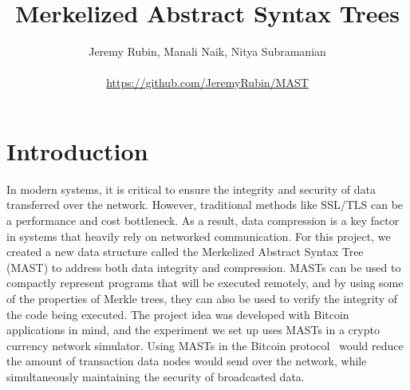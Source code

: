 \documentclass{vldb}
\begin{document}



\title{Merkelized Abstract Syntax Trees}




\author{
\alignauthor Jeremy Rubin, Manali Naik, Nitya Subramanian\\
\vspace{.2cm}
        \\
       \url{https://github.com/JeremyRubin/MAST}
}

\maketitle

\section{Introduction}

In modern systems, it is critical to ensure the integrity and security of data transferred over the network. However, traditional methods like SSL/TLS can be a performance and cost bottleneck. As a result, data compression is a key factor in systems that heavily rely on networked communication. For this project, we created a new data structure called the Merkelized Abstract Syntax Tree (MAST) to address both data integrity and compression. MASTs can be used to compactly represent programs that will be executed remotely, and by using some of the properties of Merkle trees, they can also be used to verify the integrity of the code being executed. The project idea was developed with Bitcoin applications in mind, and the experiment we set up uses MASTs in a crypto currency network simulator.  Using MASTs in the Bitcoin protocol~\cite{bitcoin} would reduce the amount of transaction data nodes would send over the network, while simultaneously maintaining the security of broadcasted data.
\end{document}
